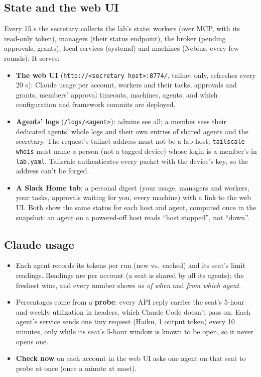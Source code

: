 \documentclass[11pt]{article}
\newcommand{\code}[1]{\texttt{#1}}
\begin{document}
\subsection{State and the web UI}
Every 15 s the secretary collects the lab's state: workers (over MCP, with its read-only
token), managers (their status endpoint), the broker (pending approvals, grants), local
services (systemd) and machines (Nebius, every few rounds). It serves:
\begin{itemize}
  \item \textbf{The web UI} (\code{http://<secretary host>:8774/}, tailnet only, refreshes
    every 20 s): Claude usage per account, workers and their tasks, approvals and grants,
    members' approval timeouts, machines, agents, and which configuration and framework commits are deployed.
  \item \textbf{Agents' logs} (\code{/logs/<agent>}): admins see all; a member sees their
    dedicated agents' whole logs and their own entries of shared agents and the secretary.
    The request's tailnet address must not be a lab host; \code{tailscale whois} must name
    a person (not a tagged device) whose login is a member's in \code{lab.yaml}. Tailscale authenticates
    every packet with the device's key, so the address can't be forged.
  \item \textbf{A Slack Home tab}: a personal digest (your usage, managers and workers,
    your tasks, approvals waiting for you, every machine) with a link to the web UI. Both
    show the same status for each host and agent, computed once in the snapshot: an agent
    on a powered-off host reads ``host stopped'', not ``down''.
\end{itemize}

\subsection{Claude usage}
\begin{itemize}
  \item Each agent records its tokens per run (new vs.\ cached) and its seat's limit
    readings. Readings are per account (a seat is shared by all its agents); the freshest
    wins, and every number shows \emph{as of when} and \emph{from which agent}.
  \item Percentages come from a \textbf{probe}: every API reply carries the seat's 5-hour
    and weekly utilization in headers, which Claude Code doesn't pass on. Each agent's
    service sends one tiny request (Haiku, 1 output token) every 10 minutes, only while
    its seat's 5-hour window is known to be open, so it never opens one.
  \item \textbf{Check now} on each account in the web UI asks one agent on that seat to
    probe at once (once a minute at most).
\end{itemize}
\end{document}
